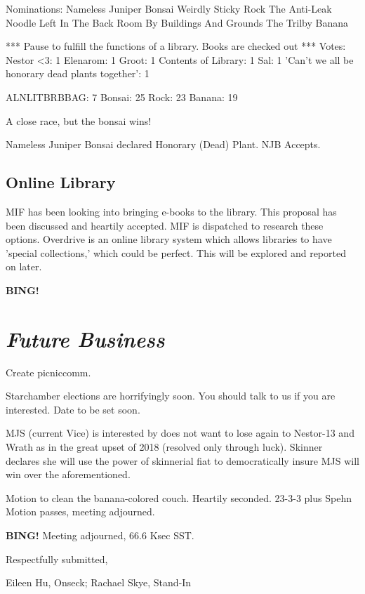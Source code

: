 \documentclass[10pt]{article}
\newcommand{\bing}{{\bf BING!} }
\newcommand{\goto}[1]{\bing \vskip 12pt \section*{{\em{#1}}}}
\newcommand{\ps}{ plus Spehn\xspace}
\newcommand{\onseck}{Eileen Hu, Onseck; Rachael Skye, Stand-In}
\begin{document}
Nominations:
Nameless Juniper Bonsai
Weirdly Sticky Rock
The Anti-Leak Noodle Left In The Back Room By Buildings And Grounds
The Trilby Banana

***
Pause to fulfill the functions of a library. Books are checked out
***
Votes:
Nestor <3: 1
Elenarom: 1
Groot: 1
Contents of Library: 1
Sal: 1
'Can't we all be honorary dead plants together': 1

ALNLITBRBBAG: 7
Bonsai: 25
Rock: 23
Banana: 19

A close race, but the bonsai wins!

Nameless Juniper Bonsai declared Honorary (Dead) Plant. NJB Accepts.

\subsection{Online Library}
MIF has been looking into bringing e-books to the library. This proposal has been discussed and heartily accepted. MIF is dispatched to research these options. Overdrive is an online library system which allows libraries to have 'special collections,' which could be perfect. This will be explored and reported on later.


\goto{Future Business}

Create picniccomm.

Starchamber elections are horrifyingly soon. You should talk to us if you are interested. Date to be set soon.

MJS (current Vice) is interested by does not want to lose again to Nestor-13 and Wrath as in the great upset of 2018 (resolved only through luck). Skinner declares she will use the power of skinnerial fiat to democratically insure MJS will win over the aforementioned.

Motion to clean the banana-colored couch.
Heartily seconded.
23-3-3\ps
Motion passes, meeting adjourned.

\bing
\noindent
Meeting adjourned, 66.6 Ksec SST.

\vspace{18pt}

\centerline{Respectfully submitted,}
\centerline{\onseck}
\end{document}
